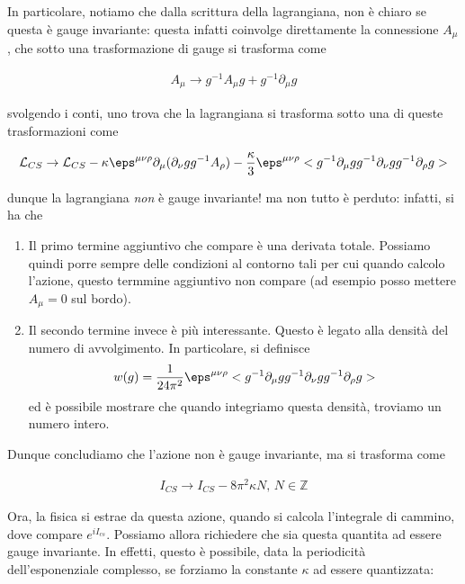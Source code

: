 \documentclass{report}
\begin{document}
In particolare, notiamo che dalla scrittura della lagrangiana, non è chiaro se questa è gauge invariante: questa infatti coinvolge direttamente la connessione \(A_\mu\), che sotto una trasformazione di gauge si trasforma come 

\begin{align}
    A_\mu \rightarrow g^{-1}A_\mu g + g^{-1}\partial_\mu g
\end{align}

svolgendo i conti, uno trova che la lagrangiana si trasforma sotto una di queste trasformazioni come 

\begin{align}
    \mathcal{L}_{CS} \rightarrow \mathcal{L}_{CS} - \kappa \eps^{\mu\nu\rho}\partial_\mu (\partial_\nu g g^{-1}A_\rho) - \frac{\kappa}{3}\eps^{\mu\nu\rho}<g^{-1}\partial_\mu g g^{-1}\partial_\nu g g^{-1} \partial_\rho g>
\end{align}

dunque la lagrangiana \emph{non} è gauge invariante! ma non tutto è perduto: infatti, si ha che 

\begin{enumerate}
    \item Il primo termine aggiuntivo che compare è una derivata totale. Possiamo quindi porre sempre delle condizioni al contorno tali per cui quando calcolo l'azione, questo termmine aggiuntivo non compare (ad esempio posso mettere \(A_\mu = 0\) sul bordo). 
    \item Il secondo termine invece è più interessante. Questo è legato alla densità del numero di avvolgimento. In particolare, si definisce 
    \begin{align}
        w(g) = \frac{1}{24\pi^2}\eps^{\mu\nu\rho}<g^{-1}\partial_\mu g g^{-1}\partial_\nu g g^{-1} \partial_\rho g>
    \end{align}
    ed è possibile mostrare che quando integriamo questa densità, troviamo un numero intero. 
\end{enumerate}

Dunque concludiamo che l'azione non è gauge invariante, ma si trasforma come 

\begin{align}
    I_{CS} \rightarrow I_{CS} - 8\pi^2 \kappa N, \, N \in \mathbb{Z}
\end{align}

Ora, la fisica si estrae da questa azione, quando si calcola l'integrale di cammino, dove compare \(e^{iI_{cs}}\). Possiamo allora richiedere che sia questa quantita ad essere gauge invariante. In effetti, questo è possibile, data la periodicità dell'esponenziale complesso, se forziamo la constante \(\kappa\) ad essere quantizzata: 
\end{document}
